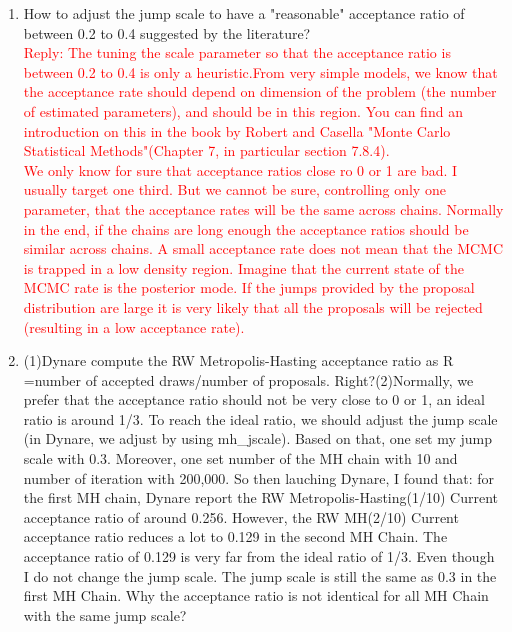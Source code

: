 \documentclass[cn,10pt,math=newtx,citestyle=gb7714-2015,bibstyle=gb7714-2015]{elegantbook}
\begin{document}
{{\begin{enumerate}
{\begin{itemize}
				\item It works quite well in practice. Anything in the range of 20 to 30 percent should be ok!
			\end{itemize}
		}
		\item How to adjust the jump scale to have a "reasonable" acceptance ratio of between 0.2 to 0.4 suggested by the literature?\\
		\textcolor{red}{Reply: The tuning the scale parameter so that the acceptance ratio is between 0.2 to 0.4 is only a heuristic.From very simple models, we know that the acceptance rate should depend on dimension of the problem (the number of estimated parameters), and should be in this region. You can find an introduction on this in the book by Robert and Casella "Monte Carlo Statistical Methods"(Chapter 7, in particular section 7.8.4).\\
			We only know for sure that acceptance ratios close ro 0 or 1 are bad. I usually target one third. But we cannot be sure, controlling only one parameter, that the acceptance rates will be the same across chains. Normally in the end, if the chains are long enough the acceptance ratios should be similar across chains. A small acceptance rate does not mean that the MCMC is trapped in a low density region. Imagine that the current state of the MCMC rate is the posterior mode. If the jumps provided by the proposal distribution are large it is very likely that all the proposals will be rejected (resulting in a low acceptance rate).}
		\item (1)Dynare compute the RW Metropolis-Hasting acceptance ratio as R =number of accepted draws/number of proposals. Right?(2)Normally, we prefer that the acceptance ratio should not be very close to 0 or 1, an ideal ratio is around 1/3. To reach the ideal ratio, we should adjust the jump scale (in Dynare, we adjust by using mh\_jscale). Based on that, one set my jump scale with 0.3. Moreover, one set number of the MH chain with 10 and number of iteration with 200,000. So then lauching Dynare, I found that: for the first MH chain, Dynare report the RW Metropolis-Hasting(1/10) Current acceptance ratio of around 0.256. However, the RW MH(2/10) Current acceptance ratio reduces a lot to 0.129 in the second MH Chain. The acceptance ratio of 0.129 is very far from the ideal ratio of 1/3. Even though I do not change the jump scale. The jump scale is still the same as 0.3 in the first MH Chain. Why the acceptance ratio is not identical for all MH Chain with the same jump scale?\\

\end{enumerate}}}
\end{document}
